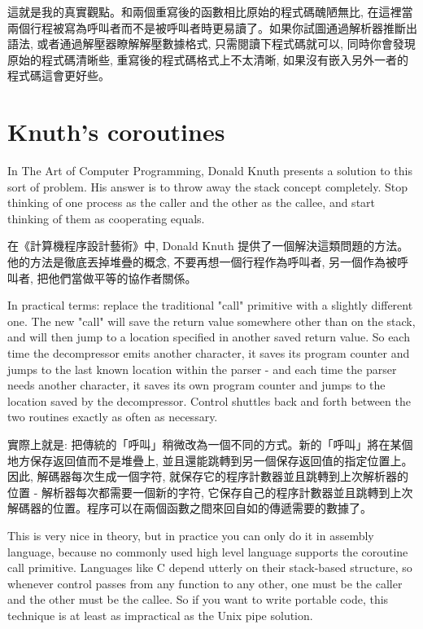 \documentclass[12pt]{article}
\begin{document}
\begin{CJK}{UTF8}{bsmi}
這就是我的真實觀點。和兩個重寫後的函數相比原始的程式碼醜陋無比, 在這裡當兩個行程被寫為呼叫者而不是被呼叫者時更易讀了。如果你試圖通過解析器推斷出語法, 或者通過解壓器瞭解解壓數據格式, 只需閱讀下程式碼就可以, 同時你會發現原始的程式碼清晰些, 重寫後的程式碼格式上不太清晰, 如果沒有嵌入另外一者的程式碼這會更好些。 

\section{Knuth's coroutines}
 In The Art of Computer Programming, Donald Knuth presents a solution to this sort of problem. His answer is to throw away the stack concept completely. Stop thinking of one process as the caller and the other as the callee, and start thinking of them as cooperating equals.

在《計算機程序設計藝術》中, Donald Knuth 提供了一個解決這類問題的方法。他的方法是徹底丟掉堆疊的概念, 不要再想一個行程作為呼叫者, 另一個作為被呼叫者, 把他們當做平等的協作者關係。

 In practical terms: replace the traditional "call" primitive with a slightly different one. The new "call" will save the return value somewhere other than on the stack, and will then jump to a location specified in another saved return value. So each time the decompressor emits another character, it saves its program counter and jumps to the last known location within the parser - and each time the parser needs another character, it saves its own program counter and jumps to the location saved by the decompressor. Control shuttles back and forth between the two routines exactly as often as necessary.

實際上就是: 把傳統的「呼叫」稍微改為一個不同的方式。新的「呼叫」將在某個地方保存返回值而不是堆疊上, 並且還能跳轉到另一個保存返回值的指定位置上。因此, 解碼器每次生成一個字符, 就保存它的程序計數器並且跳轉到上次解析器的位置 - 解析器每次都需要一個新的字符, 它保存自己的程序計數器並且跳轉到上次解碼器的位置。程序可以在兩個函數之間來回自如的傳遞需要的數據了。

 This is very nice in theory, but in practice you can only do it in assembly language, because no commonly used high level language supports the coroutine call primitive. Languages like C depend utterly on their stack-based structure, so whenever control passes from any function to any other, one must be the caller and the other must be the callee. So if you want to write portable code, this technique is at least as impractical as the Unix pipe solution.


\end{CJK}
\end{document}
